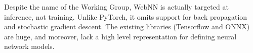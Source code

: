 Despite the name of the Working Group, WebNN is actually targeted at inference, not training.  Unlike PyTorch, it omits support for back propagation and stochastic gradient descent.  The existing libraries (Tensorflow and ONNX) are huge, and moreover, lack a high level representation for defining neural network models.


%
%
%
